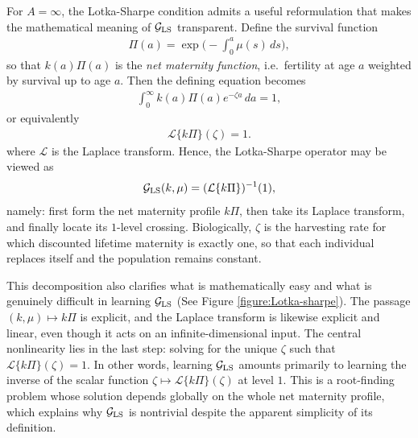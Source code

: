 \documentclass[journal,twoside,web]{ieeecolor}
\begin{document}
For $A=\infty$, the Lotka-Sharpe condition admits a useful reformulation that makes the mathematical meaning of $\mathcal{G}_{\rm LS}$ transparent. Define the survival function
\begin{align}
\Pi(a)=\exp\!\Big(-\int_0^a \mu(s)\,ds\Big),
\end{align}
so that $k(a)\Pi(a)$ is the {\em net maternity function}, i.e.\ fertility at age $a$ weighted by survival up to age $a$. Then the defining equation becomes
\begin{align}
\int_0^\infty k(a)\Pi(a)e^{-\zeta a}\,da = 1,
\end{align}
or equivalently
\begin{align}
\mathcal{L}\{k\Pi\}(\zeta)=1.
\end{align}
where $\mathcal{L}$ is the Laplace transform. 
Hence, the Lotka-Sharpe operator may be viewed as
\begin{align}
\mathcal{G}_{\rm LS}(k,\mu)=(\mathcal{L}\{k\Pi\})^{-1}(1),
\end{align}
namely: first form the net maternity profile $k\Pi$, then take its Laplace transform, and finally locate its $1$-level crossing. Biologically, $\zeta$ is the harvesting rate for which discounted lifetime maternity is exactly one, so that each individual replaces itself and the population remains constant.


This decomposition also clarifies what is mathematically easy and what is genuinely difficult in learning $\mathcal{G}_{\rm LS}$ (See Figure \ref{figure:Lotka-sharpe}). The passage $(k,\mu)\mapsto k\Pi$ is explicit, and the Laplace transform is likewise explicit and linear, even though it acts on an infinite-dimensional input. The central nonlinearity lies in the last step: solving for the unique $\zeta$ such that $\mathcal{L}\{k\Pi\}(\zeta)=1$. In other words, learning $\mathcal{G}_{\rm LS}$ amounts primarily to learning the inverse of the scalar function $\zeta\mapsto \mathcal{L}\{k\Pi\}(\zeta)$ at level $1$. This is a root-finding problem whose solution depends globally on the whole net maternity profile, which explains why $\mathcal{G}_{\rm LS}$ is nontrivial despite the apparent simplicity of its definition.
\end{document}
